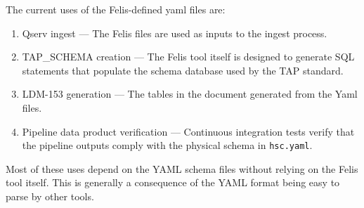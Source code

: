 The current uses of the Felis-defined yaml files are:
\begin{enumerate}
\item Qserv ingest --- The Felis files are used as inputs to the ingest process.

\item TAP\_SCHEMA creation --- The Felis tool itself is designed to generate SQL statements that
    populate the schema database used by the TAP standard.

\item LDM-153 generation --- The tables in the document generated from the Yaml files.

\item Pipeline data product verification --- Continuous integration tests verify that the pipeline
    outputs comply with the physical schema in \texttt{hsc.yaml}.
\end{enumerate}

Most of these uses depend on the YAML schema files without relying on the Felis tool itself. This is
generally a consequence of the YAML format being easy to parse by other tools.


